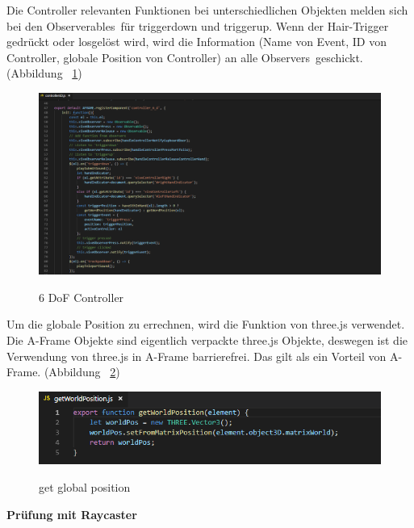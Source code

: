   Die Controller relevanten Funktionen bei unterschiedlichen Objekten melden sich bei den \glqq Observerables\grqq\ für {\selectfont triggerdown} und {\selectfont triggerup}. Wenn der Hair-Trigger gedrückt oder losgelöst wird, wird die Information (Name von Event, ID von Controller, globale Position von Controller) an alle \glqq Observers\grqq\ geschickt. (Abbildung ~\ref{fig:controller6D})
  
\begin{figure}[ht]
\vspace*{1em}
\centering
\caption[6 DoF Controller]{6 DoF Controller}
\includegraphics[width=\textwidth]{images/controller6D.png}
\label{fig:controller6D} 
\end{figure}
  
  Um die globale Position zu errechnen, wird die Funktion von three.js verwendet. Die A-Frame Objekte sind eigentlich verpackte three.js Objekte, deswegen ist die Verwendung von three.js in A-Frame barrierefrei. Das gilt als ein Vorteil von A-Frame. (Abbildung ~\ref{fig:getWorldPosition})
  
\begin{figure}[ht]
\vspace*{1em}
\centering
\caption[get global position]{get global position}
\includegraphics[width=\textwidth]{images/getWorldPosition.png}
\label{fig:getWorldPosition} 
\end{figure}
  
  \textbf{Prüfung mit Raycaster}
  
